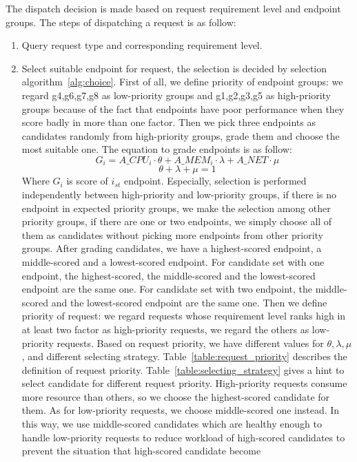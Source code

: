 The dispatch decision is made based on request requirement level and endpoint groups. The steps of dispatching a request is as follow:
\begin{enumerate}
 \item Query request type and corresponding requirement level.

 \item Select suitable endpoint for request, the selection is decided by selection algorithm~{\ref{alg:choice}}. First of all, we define priority of endpoint groups: we regard g4,g6,g7,g8 as low-priority groups and g1,g2,g3,g5 as high-priority groups because of the fact that endpoints have poor performance when they score badly in more than one factor. Then we pick three endpoints as candidates randomly from high-priority groups, grade them and choose the most suitable one. The equation to grade endpoints is as follow:
       $$G_i = A\_CPU_i \cdot \theta + A\_MEM_i \cdot \lambda + A\_NET \cdot \mu$$
       $$\theta + \lambda + \mu = 1$$
       Where $G_i$ is score of $i_{st}$ endpoint. Especially, selection is performed independently between high-priority and low-priority groups, if there is no endpoint in expected priority groups, we make the selection among other priority groups, if there are one or two endpoints, we simply choose all of them as candidates without picking more endpoints from other priority groups. After grading candidates, we have a highest-scored endpoint, a middle-scored and a lowest-scored endpoint. For candidate set with one endpoint, the highest-scored, the middle-scored and the lowest-scored endpoint are the same one. For candidate set with two endpoint, the middle-scored and the lowest-scored endpoint are the same one. Then we define priority of request: we regard requests whose requirement level ranks high in at least two factor as high-priority requests, we regard the others as low-priority requests. Based on request priority, we have different values for $\theta, \lambda, \mu$, and different selecting strategy. Table~{\ref{table:request_priority}} describes the definition of request priority.
       Table~{\ref{table:selecting_strategy}} gives a hint to select candidate for different request priority.
       High-priority requests consume more resource than others, so we choose the highest-scored candidate for them.
       As for low-priority requests, we choose middle-scored one instead. In this way, we use middle-scored candidates which are healthy enough to
       handle low-priority requests to reduce workload of high-scored candidates to prevent the situation that high-scored candidate become

\end{enumerate}
